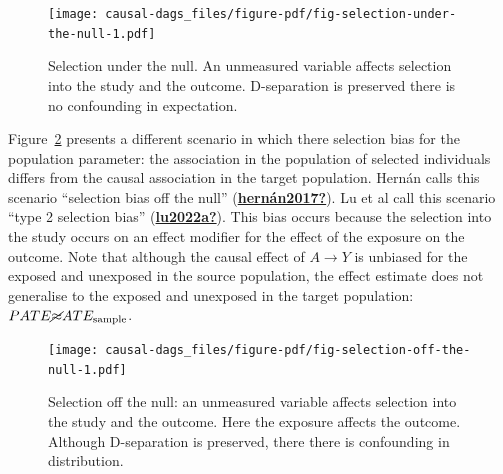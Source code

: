 \documentclass[
  singlecolumn]{report}
\begin{document}
\begin{figure}

{\centering \texttt{[image: causal-dags\_files/figure-pdf/fig-selection-under-the-null-1.pdf]}

}

\caption{\label{fig-selection-under-the-null}Selection under the null.
An unmeasured variable affects selection into the study and the outcome.
D-separation is preserved there is no confounding in expectation.}

\end{figure}

Figure~\ref{fig-selection-off-the-null} presents a different scenario in
which there selection bias for the population parameter: the association
in the population of selected individuals differs from the causal
association in the target population. Hernán calls this scenario
``selection bias off the null''
(\protect\hyperlink{ref-hernuxe1n2017}{\textbf{hernán2017?}}). Lu et al
call this scenario ``type 2 selection bias''
(\protect\hyperlink{ref-lu2022a}{\textbf{lu2022a?}}). This bias occurs
because the selection into the study occurs on an effect modifier for
the effect of the exposure on the outcome. Note that although the causal
effect of \(A\to Y\) is unbiased for the exposed and unexposed in the
source population, the effect estimate does not generalise to the
exposed and unexposed in the target population:
\(PATE \cancel{\approx} ATE_{\text{sample}}\).

\begin{figure}

{\centering \texttt{[image: causal-dags\_files/figure-pdf/fig-selection-off-the-null-1.pdf]}

}

\caption{\label{fig-selection-off-the-null}Selection off the null: an
unmeasured variable affects selection into the study and the outcome.
Here the exposure affects the outcome. Although D-separation is
preserved, there there is confounding in distribution.}

\end{figure}
\end{document}
